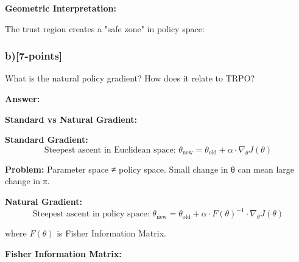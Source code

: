 \documentclass[12pt]{article}
\begin{document}
{{\textbf{Geometric Interpretation:}

The trust region creates a "safe zone" in policy space:

\begin{center}
\end{center}

\subsubsection{b)[7-points]} What is the natural policy gradient? How does it relate to TRPO?

\textbf{Answer:}

\textbf{Standard vs Natural Gradient:}

\textbf{Standard Gradient:}
\begin{equation}
\text{Steepest ascent in Euclidean space: } \theta_{\text{new}} = \theta_{\text{old}} + \alpha \cdot \nabla_\theta J(\theta)
\end{equation}

\textbf{Problem:} Parameter space ≠ policy space. Small change in θ can mean large change in π.

\textbf{Natural Gradient:}
\begin{equation}
\text{Steepest ascent in policy space: } \theta_{\text{new}} = \theta_{\text{old}} + \alpha \cdot F(\theta)^{-1} \cdot \nabla_\theta J(\theta)
\end{equation}

where $F(\theta)$ is Fisher Information Matrix.

\textbf{Fisher Information Matrix:}

}}
\end{document}
